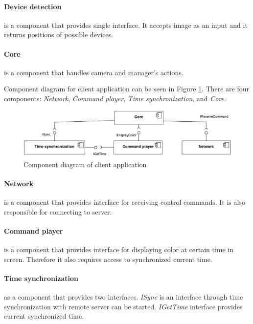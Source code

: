 \paragraph{Device detection} is a component that provides single interface. 
It accepts image as an input and it returns positions of possible devices.

\paragraph{Core} is a component that handles camera and manager's actions.

Component diagram for client application can be seen in Figure \ref{fig:component_diagram_client}.
There are four components: \emph{Network}, \emph{Command player},  \emph{Time synchronization}, and \emph{Core}.
\begin{figure}[h]
	\centering
		\includegraphics[width=13cm]{softwareArchitecture/component_diagram_client.pdf}
	\caption{Component diagram of client application}
	\label{fig:component_diagram_client}
\end{figure}

\paragraph{Network} is a component that provides interface for receiving control commands.
It is also responsible for connecting to server.

\paragraph{Command player} is a component that provides interface for displaying color at certain time in screen.
Therefore it also requires access to synchronized current time.

\paragraph{Time synchronization} as a component that provides two interfaces. 
\emph{ISync} is an interface through time synchronization with remote server can be started.
\emph{IGetTime} interface provides current synchronized time.


